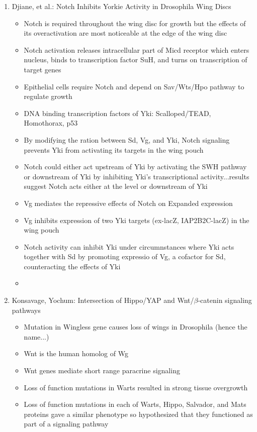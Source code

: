 \documentclass[12pt]{article}
\begin{document}
\begin{enumerate}
\item Djiane, et al.: Notch Inhibits Yorkie Activity in Drosophila Wing Discs
\begin{itemize}
	\item Notch is required throughout the wing disc for growth but the effects of its overactivation are most noticeable at the edge of the wing disc
	\item Notch activation releases intracellular part of Micd receptor which enters nucleus, binds to transcription factor SuH, and turns on transcription of target genes
	\item Epithelial cells require Notch and depend on Sav/Wts/Hpo pathway to regulate growth 
	\item DNA binding transcription factors of Yki: Scalloped/TEAD, Homothorax, p53
	\item By modifying the ration between Sd, Vg, and Yki, Notch signaling prevents Yki from activating its targets in the wing pouch
	\item Notch could either act upstream of Yki by activating the SWH pathway or downstream of Yki by inhibiting Yki's transcriptional activity...results suggest Notch acts either at the level or downstream of Yki
	\item Vg mediates the repressive effects of Notch on Expanded expression
	\item Vg inhibits expression of two Yki targets (ex-lacZ, IAP2B2C-lacZ) in the wing pouch
	\item Notch activity can inhibit Yki under circumnstances where Yki acts together with Sd by promoting expressio of Vg, a cofactor for Sd, counteracting the effects of Yki
	\item 
\end{itemize}
\item Konsavage, Yochum: Intersection of Hippo/YAP and Wnt/$\beta$-catenin signaling pathways
\begin{itemize}
	\item Mutation in Wingless gene causes loss of wings in Drosophila (hence the name...)
	\item Wnt is the human homolog of Wg
	\item Wnt genes mediate short range paracrine signaling
	\item Loss of function mutations in Warts resulted in strong tissue overgrowth
	\item Loss of function mutations in each of Warts, Hippo, Salvador, and Mats proteins gave a similar phenotype so hypothesized that they functioned as part of a signaling pathway

\end{itemize}
\end{enumerate}
\end{document}

